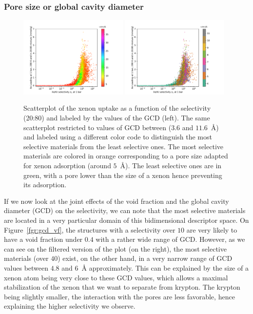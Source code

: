 \documentclass[main.tex]{subfiles}
\begin{document}
\subsubsection{Pore size or global cavity diameter}

\begin{figure}[h!]
  \centering
  \includegraphics[width=0.48\textwidth]{figures/2-thermo/Scatterplot_uptake_selectivity_gcd.pdf}
  \includegraphics[width=0.48\textwidth]{figures/2-thermo/Scatterplot_uptake_selectivity_gcd_zoom.pdf}
  \caption{Scatterplot of the xenon uptake as a function of the selectivity (20:80) and labeled by the values of the GCD (left). The same scatterplot restricted to values of GCD between ($3.6$ and $11.6$~\si{\angstrom}) and labeled using a different color code to distinguish the most selective materials from the least selective ones. The most selective materials are colored in orange corresponding to a pore size adapted for xenon adsorption (around $5$~\si{\angstrom}). The least selective ones are in green, with a pore lower than the size of a xenon hence preventing its adsorption.}\label{fgr:vol}
\end{figure}

If we now look at the joint effects of the void fraction and the global cavity diameter (GCD) on the selectivity, we can note that the most selective materials are located in a very particular domain of this bidimensional descriptor space. On Figure~\ref{fgr:gcd_vf}, the structures with a selectivity over $10$ are very likely to have a void fraction under $0.4$ with a rather wide range of GCD. However, as we can see on the filtered version of the plot (on the right), the most selective materials (over $40$) exist, on the other hand, in a very narrow range of GCD values between $4.8$ and $6$~\si{\angstrom} approximately. This can be explained by the size of a xenon atom being very close to these GCD values, which allows a maximal stabilization of the xenon that we want to separate from krypton. The krypton being slightly smaller, the interaction with the pores are less favorable, hence explaining the higher selectivity we observe. 
\end{document}
